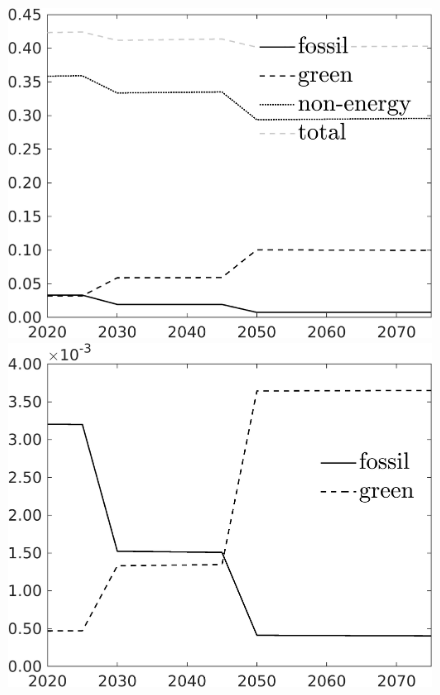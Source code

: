 \begin{figure}[h!!]
\begin{minipage}[]{0.32\textwidth}
	\end{minipage}
	\begin{minipage}[]{0.32\textwidth}
		\includegraphics[width=1\textwidth]{../../codding_model/own_basedOnFried/optimalPol_elastS_DisuSci/figures/all_1705/SingleJointTOT_OPT_T_NoTaus_Science_spillover0_sep1_BN0_ineq0_red0_etaa0.79_lgd1.png}
	\end{minipage}
\begin{minipage}[]{0.32\textwidth}
	\includegraphics[width=1\textwidth]{../../codding_model/own_basedOnFried/optimalPol_elastS_DisuSci/figures/all_1705/SingleJointTOT_OPT_T_NoTaus_LabourInp_spillover0_sep1_BN0_ineq0_red0_etaa0.79_lgd1.png}

\end{minipage}
\end{figure}
